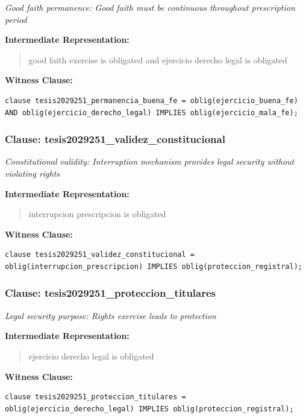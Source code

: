 \documentclass[11pt,a4paper]{article}
\begin{document}
\textit{Good faith permanence: Good faith must be continuous throughout prescription period}

\textbf{Intermediate Representation:}

\begin{quote}
good faith exercise is obligated and ejercicio derecho legal is obligated
\end{quote}

\textbf{Witness Clause:}

\begin{lstlisting}[style=witnessstyle, language=Witness]
clause tesis2029251_permanencia_buena_fe = oblig(ejercicio_buena_fe) AND oblig(ejercicio_derecho_legal) IMPLIES oblig(ejercicio_mala_fe);
\end{lstlisting}

\subsubsection{Clause: tesis2029251\_validez\_constitucional}

\textit{Constitutional validity: Interruption mechanism provides legal security without violating rights}

\textbf{Intermediate Representation:}

\begin{quote}
interrupcion prescripcion is obligated
\end{quote}

\textbf{Witness Clause:}

\begin{lstlisting}[style=witnessstyle, language=Witness]
clause tesis2029251_validez_constitucional = oblig(interrupcion_prescripcion) IMPLIES oblig(proteccion_registral);
\end{lstlisting}

\subsubsection{Clause: tesis2029251\_proteccion\_titulares}

\textit{Legal security purpose: Rights exercise leads to protection}

\textbf{Intermediate Representation:}

\begin{quote}
ejercicio derecho legal is obligated
\end{quote}

\textbf{Witness Clause:}

\begin{lstlisting}[style=witnessstyle, language=Witness]
clause tesis2029251_proteccion_titulares = oblig(ejercicio_derecho_legal) IMPLIES oblig(proteccion_registral);
\end{lstlisting}
\end{document}
